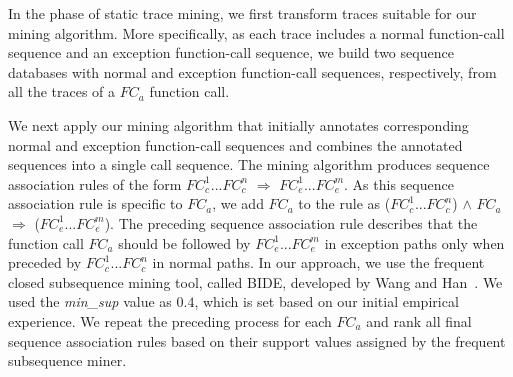 In the phase of static trace mining, we first transform traces suitable for
our mining algorithm. More specifically, as each trace includes 
a normal function-call sequence and an exception function-call sequence,
we build two sequence databases with normal and exception function-call sequences,
respectively, from all the traces of a $FC_a$ function call. 

We next apply our mining algorithm that initially annotates corresponding normal
and exception function-call sequences and combines the annotated 
sequences into a single call sequence. The mining
algorithm produces sequence association rules of the form $FC_c^1$...$FC_c^n$ $\Rightarrow$
$FC_e^1$...$FC_e^m$. As this sequence association rule is specific
to $FC_a$, we add $FC_a$ to the rule as 
($FC_c^1$...$FC_c^n$) $\wedge$ $FC_a$ $\Rightarrow$ ($FC_e^1$...$FC_e^m$).
The preceding sequence association rule describes that
the function call $FC_a$ should be followed by $FC_e^1$...$FC_e^m$
in exception paths only when preceded by $FC_c^1$...$FC_c^n$ in normal paths.
In our approach, we use the frequent closed subsequence mining tool, called
BIDE, developed by Wang and Han~\cite{wang:bide}.
We used the \emph{min\_sup} value as $0.4$, which is set based on our initial empirical experience. 
We repeat the preceding process for each $FC_a$ and rank all final sequence
association rules based on their support values assigned by the frequent subsequence 
miner.


